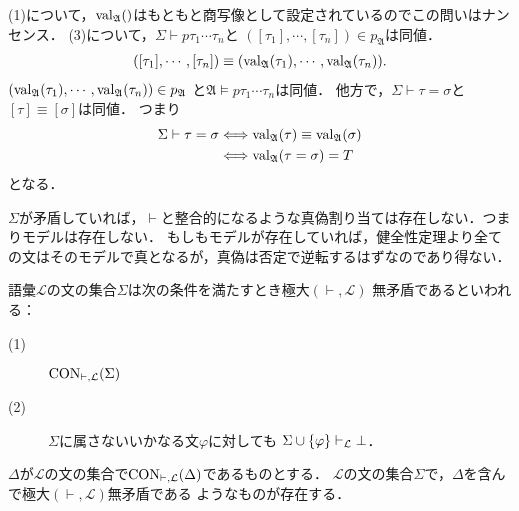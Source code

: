	\begin{sketch}
		(1)について，$\operatorname{val}_{\mathfrak{A}}()$はもともと商写像として設定されているのでこの問いはナンセンス．
		(3)について，$\Sigma \vdash p\tau_{1}\cdots\tau_{n}$と
			$([\tau_{1}],\cdots,[\tau_{n}]) \in p_{\mathfrak{A}}$は同値．
			\begin{align}
				([\tau_{1}],\cdots,[\tau_{n}]) \equiv 
				(\operatorname{val}_{\mathfrak{A}}(\tau_{1}),\cdots,\operatorname{val}_{\mathfrak{A}}(\tau_{n})).
			\end{align}
			$(\operatorname{val}_{\mathfrak{A}}(\tau_{1}),\cdots,\operatorname{val}_{\mathfrak{A}}(\tau_{n})) \in p_{\mathfrak{A}}$
			と$\mathfrak{A} \models p\tau_{1}\cdots\tau_{n}$は同値．
			他方で，$\Sigma \vdash \tau = \sigma$と$[\tau] \equiv [\sigma]$は同値．
			つまり
			\begin{align}
				\Sigma \vdash \tau = \sigma 
				&\Longleftrightarrow 
				\operatorname{val}_{\mathfrak{A}}(\tau) \equiv \operatorname{val}_{\mathfrak{A}}(\sigma) \\
				&\Longleftrightarrow \operatorname{val}_{\mathfrak{A}}(\tau = \sigma) = T
			\end{align}
			となる．
	\end{sketch}
	
	$\Sigma$が矛盾していれば，$\vdash$と整合的になるような真偽割り当ては存在しない．つまりモデルは存在しない．
	もしもモデルが存在していれば，健全性定理より全ての文はそのモデルで真となるが，真偽は否定で逆転するはずなのであり得ない．
	
	\begin{screen}
		\begin{dfn}[定義2.12.11]
			語彙$\mathcal{L}$の文の集合$\Sigma$は次の条件を満たすとき極大$(\vdash,\mathcal{L})$
			無矛盾であるといわれる：
			\begin{description}
				\item[(1)] $\operatorname{CON}_{\vdash,\mathcal{L}}(\Sigma)$
				\item[(2)] $\Sigma$に属さないいかなる文$\varphi$に対しても
					$\Sigma \cup \{\varphi\} \vdash_{{\scriptsize \mathcal{L}}} \bot$．
			\end{description}
		\end{dfn}
	\end{screen}
	
	\begin{screen}
		\begin{thm}[補題2.12.12]
			$\Delta$が$\mathcal{L}$の文の集合で$\operatorname{CON}_{\vdash,\mathcal{L}}(\Delta)$であるものとする．
			$\mathcal{L}$の文の集合$\Sigma$で，$\Delta$を含んで極大$(\vdash,\mathcal{L})$無矛盾である
			ようなものが存在する．
		\end{thm}
	\end{screen}
	
